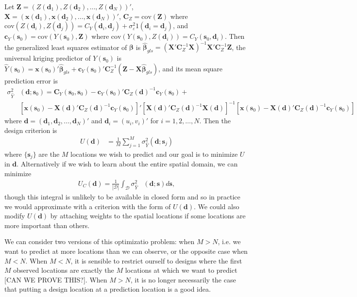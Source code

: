 \documentclass[12pt]{article}
\begin{document}
Let $\bm{Z} = (Z(\bm{d}_1), Z(\bm{d}_2), \dots, Z(\bm{d}_N) )'$, $\bm{X} = (\bm{x}(\bm{d}_1), \bm{x}(\bm{d}_2), \dots, \bm{x}(\bm{d}_N))'$, $\bm{C}_Z = \mathrm{cov}(\bm{Z})$ where $\mathrm{cov}(Z(\bm{d}_i), Z(\bm{d}_j)) = C_Y(\bm{d}_i,\bm{d}_j) + \sigma^2_\varepsilon 1(\bm{d}_i = \bm{d}_j)$, and $\bm{c}_Y(\bm{s}_0) = \mathrm{cov}(Y(\bm{s}_0), \bm{Z})$ where $\mathrm{cov}(Y(\bm{s}_0), Z(\bm{d}_i)) = C_Y(\bm{s}_0, \bm{d}_i)$. Then the generalized least squares estimator of $\bm{\beta}$ is $\widehat{\bm{\beta}}_{gls} = (\bm{X}'\bm{C}_Z^{-1}\bm{X})^{-1}\bm{X}'\bm{C}_Z^{-1}\bm{Z}$, the universal kriging predictor of $Y(\bm{s}_0)$ is $\widehat{Y}(\bm{s}_0) = \bm{x}(\bm{s}_0)'\widehat{\bm{\beta}}_{gls} + \bm{c}_Y(\bm{s}_0)'\bm{C}_Z^{-1}(\bm{Z} - \bm{X}\widehat{\bm{\beta}}_{gls})$, and its mean square prediction error is 
\begin{align*}
\sigma^2_{\widehat{Y}}&(\bm{d};\bm{s}_0) = \bm{C}_Y(\bm{s}_0, \bm{s}_0) - \bm{c}_Y(\bm{s}_0)'\bm{C}_Z(\bm{d})^{-1}\bm{c}_Y(\bm{s}_0)  + \\
&\left[\bm{x}(\bm{s}_0) - \bm{X}(\bm{d})'\bm{C}_Z(\bm{d})^{-1}\bm{c}_Y(\bm{s}_0)\right]'\left[\bm{X}(\bm{d})'\bm{C}_Z(\bm{d})^{-1}\bm{X}(\bm{d})\right]^{-1}\left[\bm{x}(\bm{s}_0) - \bm{X}(\bm{d})'\bm{C}_Z(\bm{d})^{-1}\bm{c}_Y(\bm{s}_0)\right]
\end{align*}
where $\bm{d}=(\bm{d}_1, \bm{d}_2, \dots, \bm{d}_N)'$ and $\bm{d}_i=(u_i, v_i)'$ for $i=1,2,\dots,N$. Then the design criterion is
\begin{align*}
U(\bm{d}) &= \frac{1}{M}\sum_{j=1}^M\sigma^2_{\widehat{Y}}(\bm{d};\bm{s}_j)
\end{align*}
where $\{\bm{s}_j\}$ are the $M$ locations we wish to predict and our goal is to minimize $U$ in $\bm{d}$. Alternatively if we wish to learn about the entire spatial domain, we can minimize
\begin{align*}
U_C(\bm{d}) = \frac{1}{|\mathcal{D}|}\int_{\mathcal{D}}\sigma^2_{\widehat{Y}}&(\bm{d};\bm{s})d\bm{s},
\end{align*}
though this integral is unlikely to be available in closed form and so in practice we would approximate with a criterion with the form of $U(\bm{d})$. We could also modify $U(\bm{d})$ by attaching weights to the spatial locations if some locations are more important than others.

We can consider two versions of this optimizatio problem: when $M>N$, i.e. we want to predict at more locations than we can observe, or the opposite case when $M<N$. When $M<N$, it is sensible to restrict ourself to designs where the first $M$ observed locations are exactly the $M$ locations at which we want to predict [CAN WE PROVE THIS?]. When $M>N$, it is no longer necessarily the case that putting a design location at a prediction location is a good idea.
\end{document}

